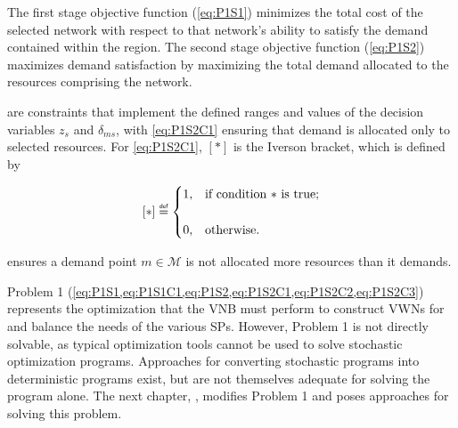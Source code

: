 \documentclass[12pt,dvipsnames]{report}
\newcommand\defeq{\mathrel{\overset{\makebox[0pt]{\mbox{\normalfont\tiny\sffamily def}}}{=}}}
\begin{document}

The first stage objective function (\cref{eq:P1S1}) minimizes the total cost of the selected network with respect to that network's ability to satisfy the demand contained within the region.  The second stage objective function (\cref{eq:P1S2}) maximizes demand satisfaction by maximizing the total demand allocated to the resources comprising the network.

 are constraints that implement the defined ranges and values of the decision variables $z_s$ and $\delta_{ms}$, with \cref{eq:P1S2C1} ensuring that demand is allocated only to selected resources.  For \cref{eq:P1S2C1}, $\left[*\right]$ is the Iverson bracket, which is defined by


\iftrue %
\begin{singlespacing}
\begin{equation} \label{eq:iverson}
\left[*\right] \defeq
	\begin{cases}
		1,& \text{if condition $*$ is true;}\\
		\\
		0,& \text{otherwise}.
	\end{cases}
\end{equation}
\end{singlespacing}
\else
\begin{equation} \label{eq:iverson}
\mathbbm{1}_{\{*\}} \defeq
	\begin{cases}
		1,& \text{if condition $\{*\}$ is true;}\\
		0,& \text{otherwise}.
	\end{cases}
\end{equation}
\fi

 ensures a demand point $m \in \mathcal{M}$ is not allocated more resources than it demands.

Problem 1 (\cref{eq:P1S1,eq:P1S1C1,eq:P1S2,eq:P1S2C1,eq:P1S2C2,eq:P1S2C3}) represents the optimization that the VNB must perform to construct VWNs for and balance the needs of the various SPs.  However, Problem 1 is not directly solvable, as typical optimization tools cannot be used to solve stochastic optimization programs.  Approaches for converting stochastic programs into deterministic programs exist, but are not themselves adequate for solving the program alone.  The next chapter, , modifies Problem 1 and poses approaches for solving this problem.
\end{document}

